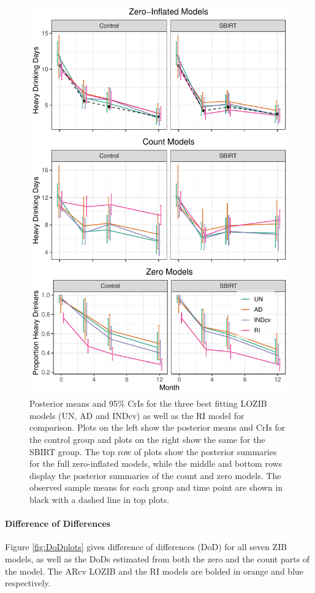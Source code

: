\documentclass[12pt]{article}
\begin{document}
\begin{figure}[t]
	\centering
	\includegraphics{figures/mean_all_plot.pdf}
	\caption{Posterior means and 95\% CrIs for the three best fitting LOZIB models (UN, AD and INDcv) as well as the RI model for comparison. Plots on the left show the posterior means and CrIs for the control group and plots on the right show the same for the SBIRT group.  The top row of plots show the posterior summaries for the full zero-inflated models, while the middle and bottom rows display the posterior summaries of the count and zero models. The observed sample means for each group and time point are shown in black with a dashed line in top plots.}
	\label{fig:meanplots}
\end{figure}


\paragraph{Difference of Differences}
Figure \ref{fig:DoDplots} gives difference of differences (DoD) for all seven ZIB models, as well as the DoDs estimated from both the zero and the count parts of the model. The ARcv LOZIB and the RI models are bolded in orange and blue respectively.
\end{document}
